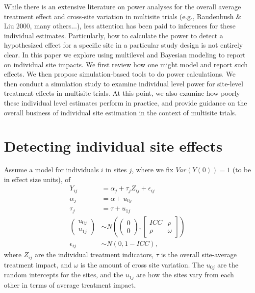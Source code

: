 \documentclass[]{article}
\begin{document}
	While there is an extensive literature on power analyses for the overall average treatment effect and cross-site variation in multisite trials (e.g., Raudenbush \& Liu 2000, many others...), less attention has been paid to inferences for these individual estimates.
	Particularly, how to calculate the power to detect a hypothesized effect for a specific site in a particular study design is not entirely clear.
	In this paper we explore using multilevel and Bayesian modeling to report on individual site impacts.
	We first review how one might model and report such effects.
	We then propose simulation-based tools to do power calculations.
	We then conduct a simulation study to examine individual level power for site-level treatment effects in multisite trials.
	At this point, we also examine how poorly these individual level estimates perform in practice, and provide guidance on the overall business of individual site estimation in the context of multisite trials.
	
	
	\section{Detecting individual site effects}
	
	Assume a model for individuals $i$ in sites $j$, where we fix  $Var(Y(0)) = 1$ (to be in effect size units), of 
	\begin{align*}
		Y_{ij} &= \alpha_j + \tau_j Z_{ij} + \epsilon_{ij} \\
		\alpha_j &= \alpha + u_{0j} \\
		\tau_j &= \tau + u_{1j} \\
		\begin{pmatrix}
			u_{0j} \\ u_{1j}
		\end{pmatrix} &\sim N\left(
		\begin{pmatrix}
			0 \\ 0
		\end{pmatrix}, 
		\begin{bmatrix}
			ICC & \rho \\ \rho & \omega
		\end{bmatrix}\right) \\
		\epsilon_{ij} &\sim N(0, 1-ICC) ,
	\end{align*}
	where $Z_{ij}$ are the individual treatment indicators, $\tau$ is the overall site-average treatment impact, and $\omega$ is the amount of cross site variation.
	The $u_{0j}$ are the random intercepts for the sites, and the $u_{1j}$ are how the sites vary from each other in terms of average treatment impact.
	
\end{document}
